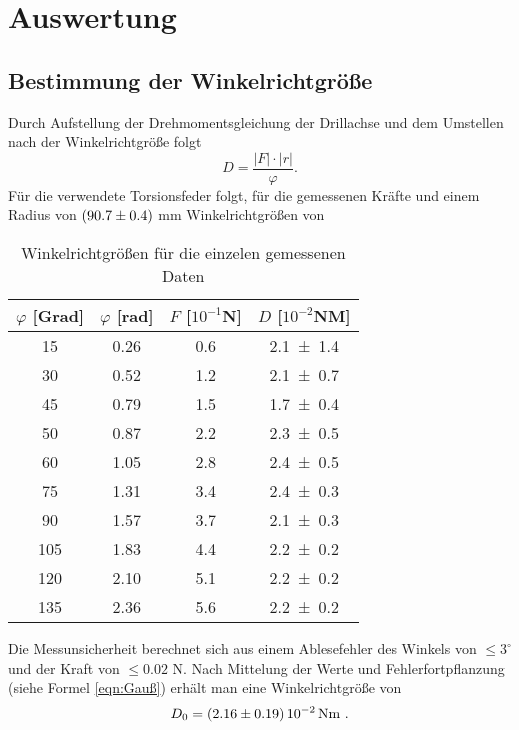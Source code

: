\section{Auswertung}
\label{sec:Auswertung}
\subsection{Bestimmung der Winkelrichtgröße}

Durch Aufstellung der Drehmomentsgleichung der Drillachse und dem Umstellen nach der Winkelrichtgröße folgt 
\begin{equation} 
	D = \frac{ |F| \cdot |r|}{\varphi} .
\end{equation}
Für die verwendete Torsionsfeder folgt, für die gemessenen Kräfte und einem Radius von $(\num{90.7 +- 0.4})$ mm Winkelrichtgrößen von

\begin{table}[ht]
	\centering
	\caption{Winkelrichtgrößen für die einzelen gemessenen Daten}
	\label{tab:winkelrichtgröße}
	\begin{tabular}{c c c c}
		\toprule
		$\varphi$ [Grad] & $\varphi$ [rad] & $F$ [$10^{-1}$N] & $D$ [$10^{-2}$NM] \\
		\midrule
		15 & 0.26 & 0.6 & \num{2.1 +- 1.4} \\
		30 & 0.52 & 1.2 & \num{2.1 +- 0.7} \\
		45 & 0.79 & 1.5 & \num{1.7 +- 0.4} \\
		50 & 0.87 & 2.2 & \num{2.3 +- 0.5} \\
		60 & 1.05 & 2.8 & \num{2.4 +- 0.5} \\
		75 & 1.31 & 3.4 & \num{2.4 +- 0.3} \\
		90 & 1.57 & 3.7 & \num{2.1 +- 0.3} \\
		105& 1.83 & 4.4 & \num{2.2 +- 0.2} \\
		120& 2.10 & 5.1 & \num{2.2 +- 0.2} \\
		135& 2.36 & 5.6 & \num{2.2 +- 0.2} \\
		\bottomrule
	\end{tabular}
\end{table}	

Die Messunsicherheit berechnet sich aus einem Ablesefehler des Winkels von $\le 3^\circ $ und der Kraft von $\le 0.02$ N. Nach Mittelung der Werte und Fehlerfortpflanzung (siehe Formel \ref{eqn:Gauß}) erhält man eine Winkelrichtgröße von
\begin{align*}
	D_0 = (\num{2.16 +- 0.19}) \, 10^{-2} \, \text{Nm} \ .
\end{align*}


